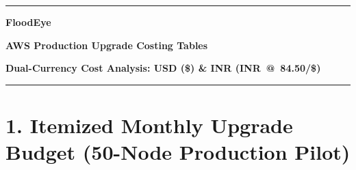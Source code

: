 \documentclass[10pt,a4paper]{article}
\begin{document}

\begin{center}
  {\color{AWSOrg}\rule{\linewidth}{2.0pt}}\par\vspace{3pt}
  {\LARGE\bfseries\color{FloodBlue}FloodEye\par}
  \vspace{2pt}
  {\Large\bfseries\color{FloodGray}AWS Production Upgrade Costing Tables\par}
  \vspace{2pt}
  {\normalsize\textbf{Dual-Currency Cost Analysis: USD (\$) \& INR (INR~@~84.50/\$)}}\par
  \vspace{2pt}
  {\color{FloodBlue}\rule{\linewidth}{0.8pt}}
\end{center}

\vspace{2pt}
\section*{1. Itemized Monthly Upgrade Budget (50-Node Production Pilot)}
\end{document}

